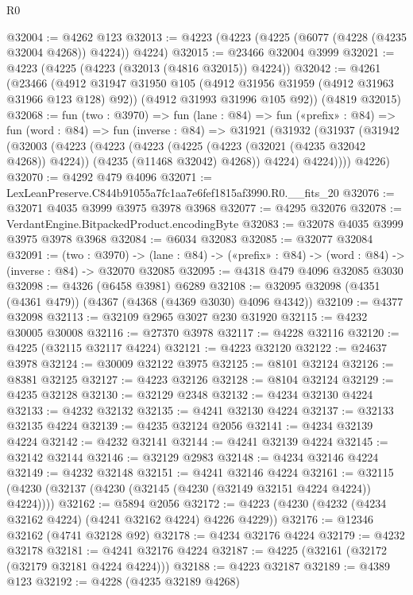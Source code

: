 \begin{lexlean}{R0}
\begin{coremodule}
@32004 := @4262 @123
@32013 := @4223 (@4223 (@4225 (@6077 (@4228 (@4235 @32004 @4268)) @4224)) @4224)
@32015 := @23466 @32004 @3999
@32021 := @4223 (@4225 (@4223 (@32013 (@4816 @32015)) @4224))
@32042 := @4261
    (@23466
      (@4912 @31947 @31950 @105 (@4912 @31956 @31959 (@4912 @31963 @31966 @123 @128) @92))
      (@4912 @31993 @31996 @105 @92))
    (@4819 @32015)
@32068 := fun (two : @3970) =>
  fun (lane : @84) =>
  fun («prefix» : @84) =>
  fun (word : @84) =>
  fun (inverse : @84) =>
  @31921
    (@31932
      (@31937
        (@31942
          (@32003
            (@4223
              (@4223
                (@4223
                  (@4225 (@4223 (@32021 (@4235 @32042 @4268)) @4224))
                  (@4235 (@11468 @32042) @4268))
                @4224)
              @4224))))
      @4226)
@32070 := @4292 @479 @4096
@32071 := LexLeanPreserve.C844b91055a7fc1aa7e6fef1815af3990.R0.__fits_20
@32076 := @32071 @4035 @3999 @3975 @3978 @3968
@32077 := @4295 @32076
@32078 := VerdantEngine.BitpackedProduct.encodingByte
@32083 := @32078 @4035 @3999 @3975 @3978 @3968
@32084 := @6034 @32083
@32085 := @32077 @32084
@32091 := (two : @3970) ->
  (lane : @84) -> («prefix» : @84) -> (word : @84) -> (inverse : @84) -> @32070 @32085
@32095 := @4318 @479 @4096 @32085 @3030
@32098 := @4326 (@6458 @3981) @6289
@32108 := @32095 @32098 (@4351 (@4361 @479)) (@4367 (@4368 (@4369 @3030) @4096 @4342))
@32109 := @4377 @32098
@32113 := @32109 @2965 @3027 @230 @31920
@32115 := @4232 @30005 @30008
@32116 := @27370 @3978
@32117 := @4228 @32116
@32120 := @4225 (@32115 @32117 @4224)
@32121 := @4223 @32120
@32122 := @24637 @3978
@32124 := @30009 @32122 @3975
@32125 := @8101 @32124
@32126 := @8381 @32125
@32127 := @4223 @32126
@32128 := @8104 @32124
@32129 := @4235 @32128
@32130 := @32129 @2348
@32132 := @4234 @32130 @4224
@32133 := @4232 @32132
@32135 := @4241 @32130 @4224
@32137 := @32133 @32135 @4224
@32139 := @4235 @32124 @2056
@32141 := @4234 @32139 @4224
@32142 := @4232 @32141
@32144 := @4241 @32139 @4224
@32145 := @32142 @32144
@32146 := @32129 @2983
@32148 := @4234 @32146 @4224
@32149 := @4232 @32148
@32151 := @4241 @32146 @4224
@32161 := @32115 (@4230 (@32137 (@4230 (@32145 (@4230 (@32149 @32151 @4224 @4224)) @4224))))
@32162 := @5894 @2056
@32172 := @4223 (@4230 (@4232 (@4234 @32162 @4224) (@4241 @32162 @4224) @4226 @4229))
@32176 := @12346 @32162 (@4741 @32128 @92)
@32178 := @4234 @32176 @4224
@32179 := @4232 @32178
@32181 := @4241 @32176 @4224
@32187 := @4225 (@32161 (@32172 (@32179 @32181 @4224 @4224)))
@32188 := @4223 @32187
@32189 := @4389 @123
@32192 := @4228 (@4235 @32189 @4268)

\end{coremodule}
\end{lexlean}
